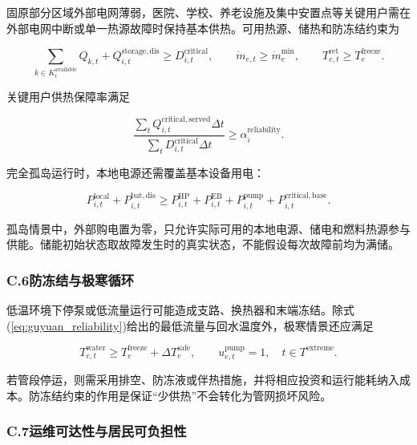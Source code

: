 固原部分区域外部电网薄弱，医院、学校、养老设施及集中安置点等关键用户需在外部电网中断或单一热源故障时保持基本供热。可用热源、储热和防冻结约束为

\begin{equation}
\sum_{k\in K_i^{\mathrm{available}}}Q_{k,t}+Q_{i,t}^{\mathrm{storage,dis}}
\geq D_{i,t}^{\mathrm{critical}},
\qquad
\dot m_{e,t}\geq\dot m_e^{\min},
\qquad
T_{e,t}^{\mathrm{ret}}\geq T_e^{\mathrm{freeze}}.
\label{eq:guyuan_reliability}
\end{equation}

关键用户供热保障率满足

\begin{equation}
\frac{\sum_tQ_{i,t}^{\mathrm{critical,served}}\Delta t}
{\sum_tD_{i,t}^{\mathrm{critical}}\Delta t}
\geq\alpha_i^{\mathrm{reliability}}.
\label{eq:guyuan_service_rate}
\end{equation}

完全孤岛运行时，本地电源还需覆盖基本设备用电：

\begin{equation}
P_{i,t}^{\mathrm{local}}+P_{i,t}^{\mathrm{bat,dis}}
\geq P_{i,t}^{\mathrm{HP}}+P_{i,t}^{\mathrm{EB}}+P_{i,t}^{\mathrm{pump}}+P_{i,t}^{\mathrm{critical,base}}.
\label{eq:guyuan_island_power}
\end{equation}

孤岛情景中，外部购电置为零，只允许实际可用的本地电源、储电和燃料热源参与供能。储能初始状态取故障发生时的真实状态，不能假设每次故障前均为满储。

\subsubsection*{C.6\quad 防冻结与极寒循环}

低温环境下停泵或低流量运行可能造成支路、换热器和末端冻结。除式(\ref{eq:guyuan_reliability})给出的最低流量与回水温度外，极寒情景还应满足

\begin{equation}
T_{e,t}^{\mathrm{water}}\geq T_e^{\mathrm{freeze}}+\Delta T_e^{\mathrm{safe}},
\qquad
u_{e,t}^{\mathrm{pump}}=1,
\quad t\in T^{\mathrm{extreme}}.
\label{eq:guyuan_freeze}
\end{equation}

若管段停运，则需采用排空、防冻液或伴热措施，并将相应投资和运行能耗纳入成本。防冻结约束的作用是保证“少供热”不会转化为管网损坏风险。

\subsubsection*{C.7\quad 运维可达性与居民可负担性}

